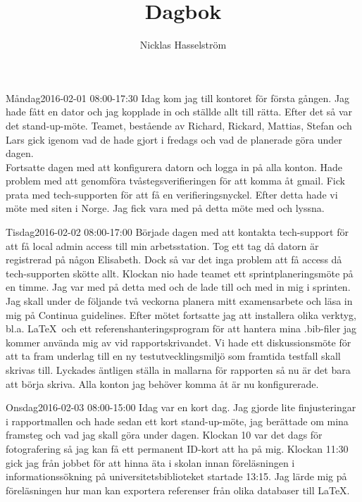 \documentclass[a4paper,oneside]{book}
\title{\Huge Dagbok}
\author{Nicklas Hasselström}
\date{}
\begin{document}
\reversemarginpar
{}
\maketitle
\newpage

\begin{diary}{Måndag}{2016-02-01 08:00-17:30}
	Idag kom jag till kontoret för första gången. Jag hade fått en dator och jag kopplade in och ställde allt till rätta. Efter det så var det stand-up-möte. Teamet, bestående av Richard, Rickard, Mattias, Stefan och Lars gick igenom vad de hade gjort i fredags och vad de planerade göra under dagen.\\
	Fortsatte dagen med att konfigurera datorn och logga in på alla konton. Hade problem med att genomföra tvåstegsverifieringen för att komma åt gmail. Fick prata med tech-supporten för att få en verifieringsnyckel. Efter detta hade vi möte med siten i Norge. Jag fick vara med på detta möte med och lyssna.
\end{diary}

\begin{diary}{Tisdag}{2016-02-02 08:00-17:00}
	Började dagen med att kontakta tech-support för att få local admin access till min arbetsstation. Tog ett tag då datorn är registrerad på någon Elisabeth. Dock så var det inga problem att få access då tech-supporten skötte  allt. Klockan nio hade teamet ett sprintplaneringsmöte på en timme. Jag var med på detta med och de lade till och med in mig i sprinten. Jag skall under de följande två veckorna planera mitt examensarbete och läsa in mig på Continua guidelines. Efter mötet fortsatte jag att installera olika verktyg, bl.a. \LaTeX\ och ett referenshanteringsprogram för att hantera mina .bib-filer jag kommer använda mig av vid rapportskrivandet. Vi hade ett diskussionsmöte för att ta fram underlag till en ny testutvecklingsmiljö som framtida testfall skall skrivas till. Lyckades äntligen ställa in mallarna för rapporten så nu är det bara att börja skriva. Alla konton jag behöver komma åt är nu konfigurerade.
\end{diary}

\begin{diary}{Onsdag}{2016-02-03 08:00-15:00}
	Idag var en kort dag. Jag gjorde lite finjusteringar i rapportmallen och hade sedan ett kort stand-up-möte, jag berättade om mina framsteg och vad jag skall göra under dagen. Klockan 10 var det dags för fotografering så jag kan få ett permanent ID-kort att ha på mig. Klockan 11:30 gick jag från jobbet för att hinna äta i skolan innan föreläsningen i informationssökning på universitetsbiblioteket startade 13:15. Jag lärde mig på föreläsningen hur man kan exportera referenser från olika databaser till \LaTeX .
\end{diary}
\end{document}
